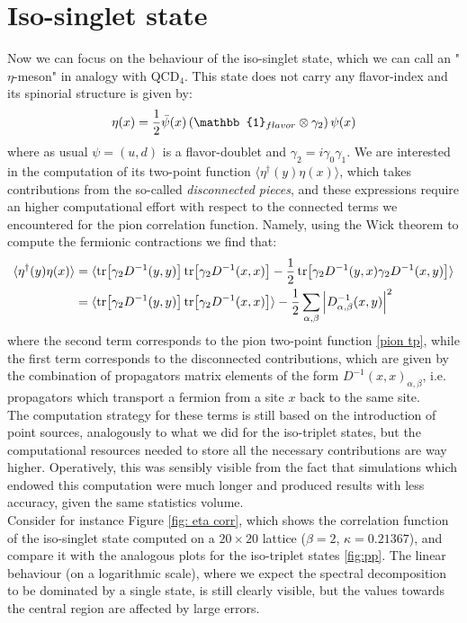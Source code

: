 \section{Iso-singlet state}
Now we can focus on the behaviour of the iso-singlet state, which we can call an "$\eta$-meson" in analogy with QCD$_4$. This state does not carry any flavor-index and its spinorial structure is given by:
\begin{equation}
    \eta(x) = \frac{1}{2} \Bar{\psi}(x) \left(\mathbb{1}_{flavor} \otimes \gamma_2\right) \psi(x)
\end{equation}
where as usual $\psi = (u, d)$ is a flavor-doublet and $\gamma_2 = i \gamma_0 \gamma_1$. We are interested in the computation of its two-point function $\langle \eta^\dagger(y) \eta(x) \rangle$, which takes contributions from the so-called \textit{disconnected pieces}, and these expressions require an higher computational effort with respect to the connected terms we encountered for the pion correlation function. Namely, using the Wick theorem to compute the fermionic contractions we find that:
\begin{equation}
\begin{split}
        \langle \eta^\dagger(y) \eta(x) \rangle &= \langle \tr[\gamma_2 D^{-1}(y,y)]\tr[\gamma_2 D^{-1}(x,x)] - \frac{1}{2}\tr[\gamma_2 D^{-1}(y,x) \gamma_2 D^{-1}(x,y)] \rangle \\
        &= \langle \tr[\gamma_2 D^{-1}(y,y)]\tr[\gamma_2 D^{-1}(x,x)]\rangle -\frac{1}{2} \sum_{\alpha, \beta} \abs{D^{-1}_{\alpha, \beta}(x,y)}^2
\end{split}
\end{equation}
where the second term corresponds to the pion two-point function \eqref{pion tp}, while the first term corresponds to the disconnected contributions, which are given by the combination of propagators matrix elements of the form $D^{-1}(x,x)_{\alpha, \beta}$, i.e. propagators which transport a fermion from a site $x$ back to the same site.
\\ The computation strategy for these terms is still based on the introduction of point sources, analogously to what we did for the iso-triplet states, but the computational resources needed to store all the necessary contributions are way higher. Operatively, this was sensibly visible from the fact that simulations which endowed this computation were much longer and produced results with less accuracy, given the same statistics volume.
\\ Consider for instance Figure \eqref{fig: eta corr}, which shows the correlation function of the iso-singlet state computed on a $20 \times 20$ lattice ($\beta = 2$, $\kappa = 0.21367$), and compare it with the analogous plots for the iso-triplet states \eqref{fig:pp}. The linear behaviour (on a logarithmic scale), where we expect the spectral decomposition to be dominated by a single state, is still clearly visible, but the values towards the central region are affected by large errors.
